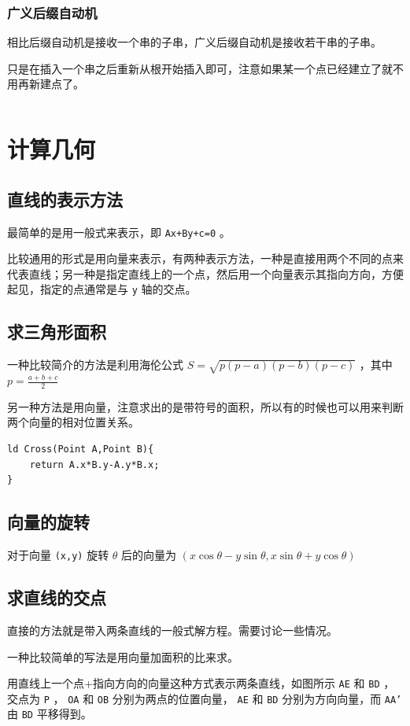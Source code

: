 \documentclass[UTF-8]{ctexart}
\newcommand{\cpp}[1]{\inputminted[bgcolor=bg,breaklines,breakanywhere=true]{c++}{#1}}
\begin{document}
			\subsubsection{广义后缀自动机}
			相比后缀自动机是接收一个串的子串，广义后缀自动机是接收若干串的子串。
	
			只是在插入一个串之后重新从根开始插入即可，注意如果某一个点已经建立了就不用再新建点了。
			\cpp{code//String//lsam.cpp}
\section{计算几何}
	\subsection{直线的表示方法}
	最简单的是用一般式来表示，即 \texttt{Ax+By+c=0} 。  
	
	比较通用的形式是用向量来表示，有两种表示方法，一种是直接用两个不同的点来代表直线；另一种是指定直线上的一个点，然后用一个向量表示其指向方向，方便起见，指定的点通常是与 \texttt{y} 轴的交点。
	\subsection{求三角形面积}
	
	一种比较简介的方法是利用海伦公式 $S=\sqrt{p(p-a)(p-b)(p-c)}$ ，其中 $p=\frac{a+b+c}{2}$
	
	另一种方法是用向量，注意求出的是带符号的面积，所以有的时候也可以用来判断两个向量的相对位置关系。
	
\begin{verbatim}
ld Cross(Point A,Point B){
    return A.x*B.y-A.y*B.x;
}
\end{verbatim}
	
	\subsection{向量的旋转}
	对于向量 \texttt{(x,y)} 旋转 $\theta$ 后的向量为 $(x\cos\theta-y\sin\theta,x\sin\theta+y\cos\theta)$
	
	\subsection{求直线的交点}
	直接的方法就是带入两条直线的一般式解方程。需要讨论一些情况。  
	
	一种比较简单的写法是用向量加面积的比来求。
	  
	用直线上一个点+指向方向的向量这种方式表示两条直线，如图所示 \texttt{AE} 和 \texttt{BD} ，交点为 \texttt{P} ， \texttt{OA} 和 \texttt{OB} 分别为两点的位置向量， \texttt{AE} 和 \texttt{BD} 分别为方向向量，而 \texttt{AA'} 由 \texttt{BD} 平移得到。
	
\end{document}
